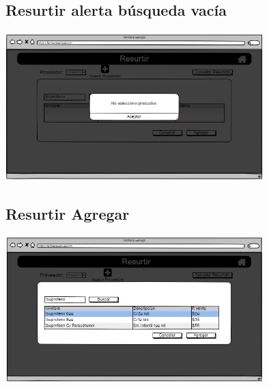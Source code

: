 \begin{flushleft}
	\subsection{Resurtir alerta búsqueda vacía} \label{UI: resurtir alerta busqueda}
	\begin{center}
		\includegraphics[width=10cm]{pantallas/images/13resurtirbusquedavacia.png}\\	
		 	
	\end{center}
	\subsection{Resurtir Agregar} \label{UI: resurtir agregar}
	\begin{center}
		\includegraphics[width=10cm]{pantallas/images/14resurtiragregar.png}\\	
		 	
	\end{center}

\end{flushleft}
